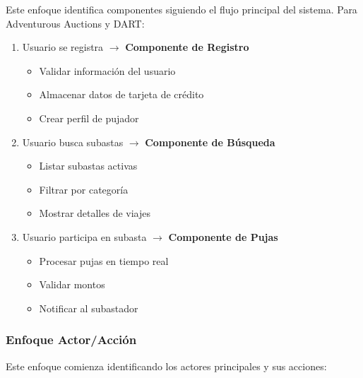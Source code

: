 Este enfoque identifica componentes siguiendo el flujo principal del sistema. Para Adventurous Auctions y DART:

\begin{enumerate}
    \item Usuario se registra \(\rightarrow\) \textbf{Componente de Registro}
    \begin{itemize}
        \item Validar información del usuario
        \item Almacenar datos de tarjeta de crédito
        \item Crear perfil de pujador
    \end{itemize}
    
    \item Usuario busca subastas \(\rightarrow\) \textbf{Componente de Búsqueda}
    \begin{itemize}
        \item Listar subastas activas
        \item Filtrar por categoría
        \item Mostrar detalles de viajes
    \end{itemize}
    
    \item Usuario participa en subasta \(\rightarrow\) \textbf{Componente de Pujas}
    \begin{itemize}
        \item Procesar pujas en tiempo real
        \item Validar montos
        \item Notificar al subastador
    \end{itemize}
\end{enumerate}

\subsubsection{Enfoque Actor/Acción}

Este enfoque comienza identificando los actores principales y sus acciones:

